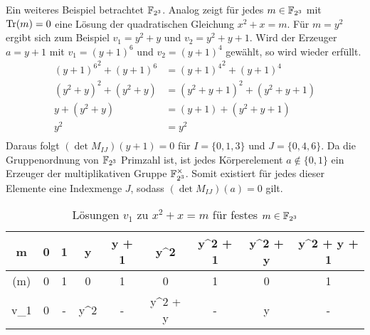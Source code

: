 Ein weiteres Beispiel betrachtet $\field{2}[3]$. Analog zeigt  für jedes $m \in \field{2}[3]$ mit $\mathrm{Tr}(m) = 0$ eine Lösung der quadratischen Gleichung $x^2+x=m$. Für $m=y^2$ ergibt sich zum Beispiel $v_1 = y^2 + y$ und $v_2 = y^2 + y + 1$. Wird der Erzeuger $a = y+1$ mit $v_1 = (y+1)^6$ und $v_2 = (y+1)^4$ gewählt, so wird wieder  erfüllt.
\begin{align*}
    {(y+1)^6}^2 + (y+1)^6 &= {(y+1)^4}^2 + (y+1)^4 \\
    (y^2 + y)^2 + (y^2 + y) &= (y^2 + y + 1)^2 + (y^2 + y + 1) \\
    y + (y^2 + y) &= (y+1) + (y^2 + y + 1) \\
    y^2 &= y^2 \\
\end{align*}
Daraus folgt $(\det M_{IJ})(y+1) = 0$ für $I = \{0,1,3\}$ und $J = \{0,4,6\}$.
Da die Gruppenordnung von $\field{2}[3]$ Primzahl ist, ist jedes Körperelement $a \notin \{0,1\}$ ein Erzeuger der multiplikativen Gruppe $\field{2}[3]^\times$. Somit existiert für jedes dieser Elemente eine Indexmenge $J$, sodass $(\det M_{IJ})(a) = 0$ gilt.

{\renewcommand{\arraystretch}{1.5}
\begin{table}
    \centering
    \begin{tabular}{|C|C|C|C|C|C|C|C|C|}
    \hline
    m               & 0 & 1 & y & y + 1 & y^2 & y^2 + 1 & y^2 + y  & y^2 + y + 1 \\
    \hline
    (m)  & 0 & 1 & 0 & 1     & 0   & 1       & 0        & 1 \\
    \hline
    v_1         & 0 & - & y^2 & - & y^2 + y & - & y & - \\
    \hline
    \end{tabular}
    \caption{Lösungen $v_1$ zu $x^2 + x = m$ für festes $m \in \field{2}[3]$} \label{table:sol_013F2_3}
\end{table}
}

